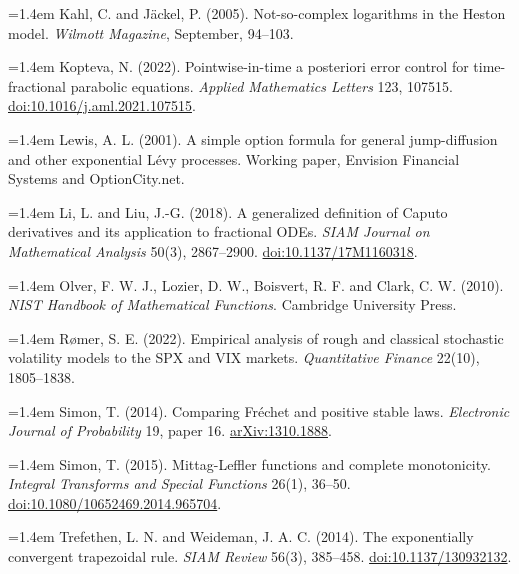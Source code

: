 \documentclass[11pt,a4paper]{article}
\begin{document}
\hangindent=1.4em Kahl, C. and Jäckel, P. (2005). Not-so-complex logarithms in the Heston model. \emph{Wilmott Magazine}, September, 94–103.\par

\hangindent=1.4em Kopteva, N. (2022). Pointwise-in-time a posteriori error control for time-fractional parabolic equations. \emph{Applied Mathematics Letters} 123, 107515. \href{https://doi.org/10.1016/j.aml.2021.107515}{doi:10.1016/j.aml.2021.107515}.\par

\hangindent=1.4em Lewis, A. L. (2001). A simple option formula for general jump-diffusion and other exponential Lévy processes. Working paper, Envision Financial Systems and OptionCity.net.\par

\hangindent=1.4em Li, L. and Liu, J.-G. (2018). A generalized definition of Caputo derivatives and its application to fractional ODEs. \emph{SIAM Journal on Mathematical Analysis} 50(3), 2867–2900. \href{https://doi.org/10.1137/17M1160318}{doi:10.1137/17M1160318}.\par

\hangindent=1.4em Olver, F. W. J., Lozier, D. W., Boisvert, R. F. and Clark, C. W. (2010). \emph{NIST Handbook of Mathematical Functions}. Cambridge University Press.\par

\hangindent=1.4em Rømer, S. E. (2022). Empirical analysis of rough and classical stochastic volatility models to the SPX and VIX markets. \emph{Quantitative Finance} 22(10), 1805–1838.\par

\hangindent=1.4em Simon, T. (2014). Comparing Fréchet and positive stable laws. \emph{Electronic Journal of Probability} 19, paper 16. \href{https://arxiv.org/abs/1310.1888v2}{arXiv:1310.1888}.\par

\hangindent=1.4em Simon, T. (2015). Mittag-Leffler functions and complete monotonicity. \emph{Integral Transforms and Special Functions} 26(1), 36–50. \href{https://doi.org/10.1080/10652469.2014.965704}{doi:10.1080/10652469.2014.965704}.\par

\hangindent=1.4em Trefethen, L. N. and Weideman, J. A. C. (2014). The exponentially convergent trapezoidal rule. \emph{SIAM Review} 56(3), 385–458. \href{https://doi.org/10.1137/130932132}{doi:10.1137/130932132}.\par

\endgroup
\end{document}
